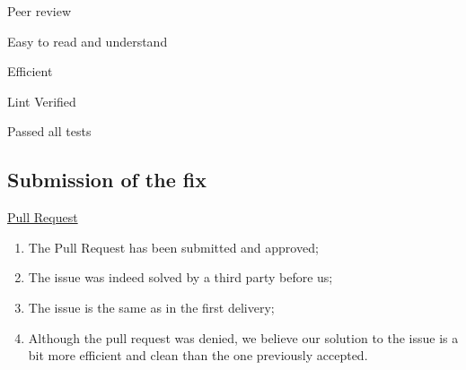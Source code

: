 \documentclass[main.tex]{subfiles}
\newcommand*{\checklist}{\makebox[0pt][l]{$\square$}\raisebox{.15ex}{\hspace{0.1em}$\checkmark$}}
\begin{document}
\checklist Peer review

\checklist  Easy to read and understand

\checklist Efficient

\checklist Lint Verified

\checklist Passed all tests

\subsection{Submission of the fix}

\href{https://github.com/BoostIO/Boostnote/pull/2657}{Pull Request}

\begin{enumerate}
    \item The Pull Request has been submitted and approved;
    \item The issue was indeed solved by a third party before us;
    \item The issue is the same as in the first delivery;
    \item Although the pull request was denied, we believe our solution to the issue is a bit more efficient and clean than the one previously accepted.
\end{enumerate}

\nocite{*}
\end{document}

